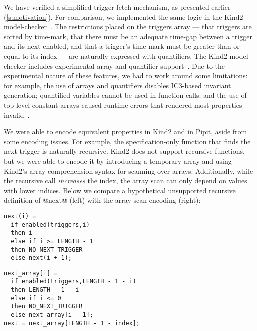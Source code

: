 We have verified a simplified trigger-fetch mechanism, as presented earlier (\autoref{s:motivation}).
For comparison, we implemented the same logic in the Kind2 model-checker~\cite{champion2016kind2}.
The restrictions placed on the triggers array --- that triggers are sorted by time-mark, that there must be an adequate time-gap between a trigger and its next-enabled, and that a trigger's time-mark must be greater-than-or-equal-to its index --- are naturally expressed with quantifiers.
The Kind2 model-checker includes experimental array and quantifier support~\cite{kind2userdoc}.
Due to the experimental nature of these features, we had to work around some limitations: for example, the use of arrays and quantifiers disables IC3-based invariant generation; quantified variables cannot be used in function calls; and the use of top-level constant arrays caused runtime errors that rendered most properties invalid~\cite{kind2024toparray}.

We were able to encode equivalent properties in Kind2 and in Pipit, aside from some encoding issues.
For example, the specification-only function that finds the next trigger is naturally recursive.
Kind2 does not support recursive functions, but we were able to encode it by introducing a temporary array and using Kind2's array comprehension syntax for scanning over arrays.
Additionally, while the recursive call \emph{increases} the index, the array scan can only depend on values with lower indices.
Below we compare a hypothetical unsupported recursive definition of @next@ (left) with the array-scan encoding (right):

\begin{minipage}{0.4\textwidth}
\begin{verbatim}
next(i) =
  if enabled(triggers,i)
  then i
  else if i >= LENGTH - 1
  then NO_NEXT_TRIGGER
  else next(i + 1);

\end{verbatim}
\end{minipage}
\begin{minipage}{0.55\textwidth}
\begin{verbatim}
next_array[i] =
  if enabled(triggers,LENGTH - 1 - i)
  then LENGTH - 1 - i
  else if i <= 0
  then NO_NEXT_TRIGGER
  else next_array[i - 1];
next = next_array[LENGTH - 1 - index];

\end{verbatim}
\end{minipage}

